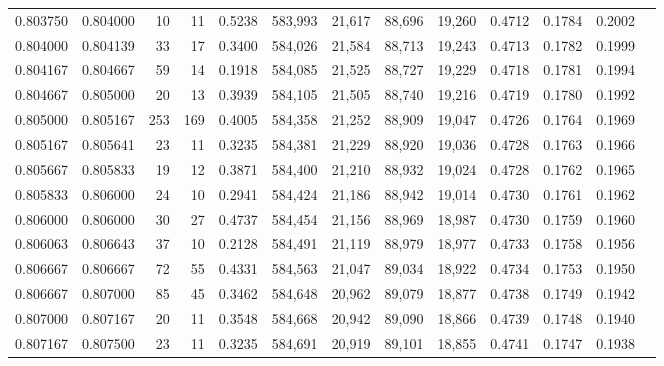 \begin{tabular}{rrrrrrrrrrrrr}
0.803750 & 0.804000 &    10 &  11 &                                     0.5238 & 583,993 &  21,617 &  88,696 &  19,260 & 0.4712 & 0.1784 & 0.2002 \\
0.804000 & 0.804139 &    33 &  17 &                                     0.3400 & 584,026 &  21,584 &  88,713 &  19,243 & 0.4713 & 0.1782 & 0.1999 \\
0.804167 & 0.804667 &    59 &  14 &                                     0.1918 & 584,085 &  21,525 &  88,727 &  19,229 & 0.4718 & 0.1781 & 0.1994 \\
0.804667 & 0.805000 &    20 &  13 &                                     0.3939 & 584,105 &  21,505 &  88,740 &  19,216 & 0.4719 & 0.1780 & 0.1992 \\
0.805000 & 0.805167 &   253 & 169 &                                     0.4005 & 584,358 &  21,252 &  88,909 &  19,047 & 0.4726 & 0.1764 & 0.1969 \\
0.805167 & 0.805641 &    23 &  11 &                                     0.3235 & 584,381 &  21,229 &  88,920 &  19,036 & 0.4728 & 0.1763 & 0.1966 \\
0.805667 & 0.805833 &    19 &  12 &                                     0.3871 & 584,400 &  21,210 &  88,932 &  19,024 & 0.4728 & 0.1762 & 0.1965 \\
0.805833 & 0.806000 &    24 &  10 &                                     0.2941 & 584,424 &  21,186 &  88,942 &  19,014 & 0.4730 & 0.1761 & 0.1962 \\
0.806000 & 0.806000 &    30 &  27 &                                     0.4737 & 584,454 &  21,156 &  88,969 &  18,987 & 0.4730 & 0.1759 & 0.1960 \\
0.806063 & 0.806643 &    37 &  10 &                                     0.2128 & 584,491 &  21,119 &  88,979 &  18,977 & 0.4733 & 0.1758 & 0.1956 \\
0.806667 & 0.806667 &    72 &  55 &                                     0.4331 & 584,563 &  21,047 &  89,034 &  18,922 & 0.4734 & 0.1753 & 0.1950 \\
0.806667 & 0.807000 &    85 &  45 &                                     0.3462 & 584,648 &  20,962 &  89,079 &  18,877 & 0.4738 & 0.1749 & 0.1942 \\
0.807000 & 0.807167 &    20 &  11 &                                     0.3548 & 584,668 &  20,942 &  89,090 &  18,866 & 0.4739 & 0.1748 & 0.1940 \\
0.807167 & 0.807500 &    23 &  11 &                                     0.3235 & 584,691 &  20,919 &  89,101 &  18,855 & 0.4741 & 0.1747 & 0.1938 \\

\end{tabular}
